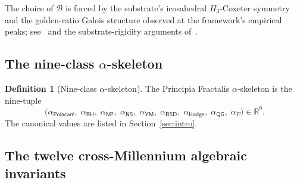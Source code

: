 \documentclass[11pt,a4paper]{amsart}
\theoremstyle{plain}
\theoremstyle{definition}
\newtheorem{definition}[theorem]{Definition}
\begin{document}
The choice of $\mathcal{B}$ is forced by the substrate's icosahedral $H_3$-Coxeter symmetry and the golden-ratio Galois structure observed at the framework's empirical peaks; see~\cite[Chapter~9]{cohen2026book} and the substrate-rigidity arguments of~\cite{cohen2025unifiedClay,cohen2026corroborating}.

\subsection{The nine-class \texorpdfstring{$\alpha$-skeleton}{alpha-skeleton}}\label{subsec:alpha-skeleton}

\begin{definition}[Nine-class $\alpha$-skeleton]\label{def:alpha-skeleton}
The Principia Fractalis $\alpha$-skeleton is the nine-tuple
\[
\bigl(\alpha_{\textsf{Poincar\'e}},\;\alpha_{\textsf{RH}},\;\alpha_{\textsf{NP}},\;\alpha_{\textsf{NS}},\;\alpha_{\textsf{YM}},\;\alpha_{\textsf{BSD}},\;\alpha_{\textsf{Hodge}},\;\alpha_{\textsf{QG}},\;\alpha_{P}\bigr) \in \mathbb{R}^9.
\]
The canonical values are listed in Section~\ref{sec:intro}.
\end{definition}

\subsection{The twelve cross-Millennium algebraic invariants}
\end{document}
